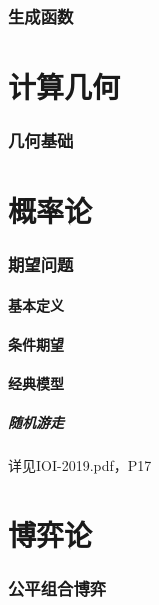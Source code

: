 \documentclass[12pt,a4paper]{article}
\begin{document}
\newpage
\section{生成函数}

\newpage
\part{计算几何}
\section{几何基础}

\newpage
\part{概率论}
\section{期望问题}
\subsection{基本定义} %
\subsection{条件期望}
\subsection{经典模型} %
\subsubsection{随机游走}
详见IOI-2019.pdf，P17

\newpage
\part{博弈论}
\section{公平组合博弈}
\end{document}
